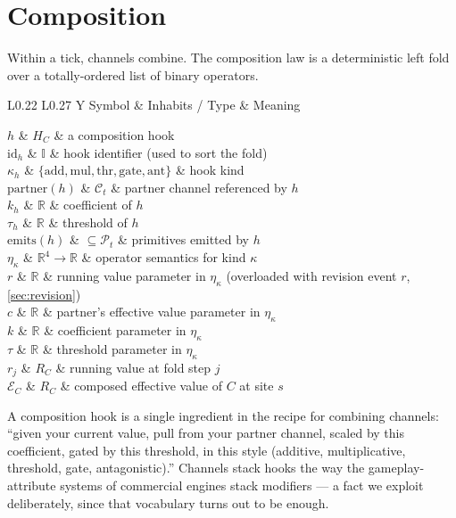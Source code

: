 \documentclass[journal,onecolumn,11pt]{IEEEtran}
\theoremstyle{definition}
\newcommand{\notationtable}[3]{%
  \begin{table}[ht]
  \centering
  \caption{#1}
  \label{#2}
  \small
  \renewcommand{\arraystretch}{1.1}
  \begin{tabularx}{\linewidth}{L{0.22\linewidth} L{0.27\linewidth} Y}
  \toprule
  Symbol & Inhabits / Type & Meaning \\
  \midrule
  #3
  \bottomrule
  \end{tabularx}
  \end{table}%
}
\begin{document}
\section{Composition}
\label{sec:compose}

Within a tick, channels combine. The composition law is a deterministic left fold over a totally-ordered list of binary operators.

\notationtable{Symbols introduced in \cref{sec:compose}.}{tab:notation-compose}{
$h$                       & $H_C$                        & a composition hook \\
$\mathrm{id}_h$           & $\mathbb{I}$                 & hook identifier (used to sort the fold) \\
$\kappa_h$                & $\{\mathrm{add},\mathrm{mul},\mathrm{thr},\mathrm{gate},\mathrm{ant}\}$ & hook kind \\
$\mathrm{partner}(h)$     & $\mathcal{C}_t$              & partner channel referenced by $h$ \\
$k_h$                     & $\mathbb{R}$                 & coefficient of $h$ \\
$\tau_h$                  & $\mathbb{R}$                 & threshold of $h$ \\
$\mathrm{emits}(h)$       & $\subseteq \mathcal{P}_t$    & primitives emitted by $h$ \\
$\eta_\kappa$             & $\mathbb{R}^4 \to \mathbb{R}$ & operator semantics for kind $\kappa$ \\
$r$                       & $\mathbb{R}$                 & running value parameter in $\eta_\kappa$ (overloaded with revision event $r$, \cref{sec:revision}) \\
$c$                       & $\mathbb{R}$                 & partner's effective value parameter in $\eta_\kappa$ \\
$k$                       & $\mathbb{R}$                 & coefficient parameter in $\eta_\kappa$ \\
$\tau$                    & $\mathbb{R}$                 & threshold parameter in $\eta_\kappa$ \\
$r_j$                     & $R_C$                        & running value at fold step $j$ \\
$\mathcal{E}_C$           & $R_C$                        & composed effective value of $C$ at site $s$ \\
}

A composition hook is a single ingredient in the recipe for combining channels: ``given your current value, pull from your partner channel, scaled by this coefficient, gated by this threshold, in this style (additive, multiplicative, threshold, gate, antagonistic).'' Channels stack hooks the way the gameplay-attribute systems of commercial engines stack modifiers --- a fact we exploit deliberately, since that vocabulary turns out to be enough.
\end{document}
